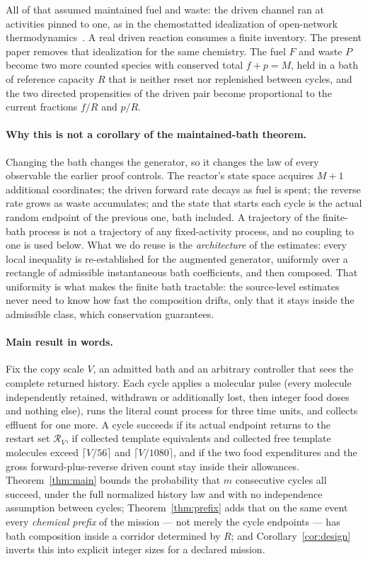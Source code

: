 \documentclass[11pt,a4paper]{article}
\theoremstyle{plain}
\theoremstyle{definition}
\theoremstyle{remark}
\newcommand{\cR}{\mathcal R}
\begin{document}
All of that assumed maintained fuel and waste: the driven channel ran at activities pinned to one, as in the chemostatted idealization of open-network thermodynamics~\citep{polettini2014,rao2016}. A real driven reaction consumes a finite inventory. The present paper removes that idealization for the same chemistry. The fuel $F$ and waste $P$ become two more counted species with conserved total $f+p=M$, held in a bath of reference capacity $R$ that is neither reset nor replenished between cycles, and the two directed propensities of the driven pair become proportional to the current fractions $f/R$ and $p/R$.

\paragraph{Why this is not a corollary of the maintained-bath theorem.}
Changing the bath changes the generator, so it changes the law of every observable the earlier proof controls. The reactor's state space acquires $M+1$ additional coordinates; the driven forward rate decays as fuel is spent; the reverse rate grows as waste accumulates; and the state that starts each cycle is the actual random endpoint of the previous one, bath included. A trajectory of the finite-bath process is not a trajectory of any fixed-activity process, and no coupling to one is used below. What we do reuse is the \emph{architecture} of the estimates: every local inequality is re-established for the augmented generator, uniformly over a rectangle of admissible instantaneous bath coefficients, and then composed. That uniformity is what makes the finite bath tractable: the source-level estimates never need to know how fast the composition drifts, only that it stays inside the admissible class, which conservation guarantees.

\paragraph{Main result in words.}
Fix the copy scale $V$, an admitted bath and an arbitrary controller that sees the complete returned history. Each cycle applies a molecular pulse (every molecule independently retained, withdrawn or additionally lost, then integer food doses and nothing else), runs the literal count process for three time units, and collects effluent for one more. A cycle succeeds if its actual endpoint returns to the restart set $\cR_V$, if collected template equivalents and collected free template molecules exceed $\lceil V/56\rceil$ and $\lceil V/1080\rceil$, and if the two food expenditures and the gross forward-plus-reverse driven count stay inside their allowances. Theorem~\ref{thm:main} bounds the probability that $m$ consecutive cycles all succeed, under the full normalized history law and with no independence assumption between cycles; Theorem~\ref{thm:prefix} adds that on the same event every \emph{chemical prefix} of the mission --- not merely the cycle endpoints --- has bath composition inside a corridor determined by $R$; and Corollary~\ref{cor:design} inverts this into explicit integer sizes for a declared mission.
\end{document}
